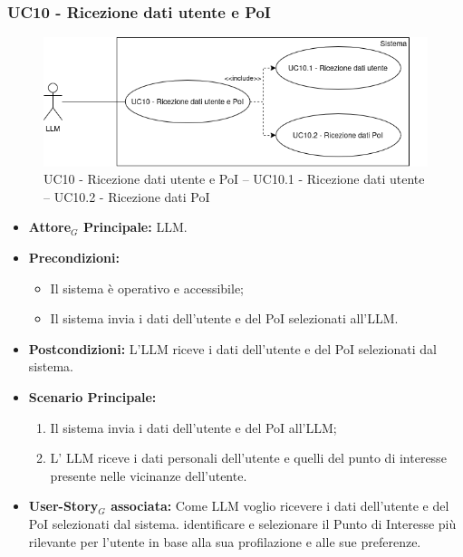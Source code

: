 \documentclass[11pt]{article}
\begin{document}
\begin{justify}
\subsubsection{\textbf{UC10 - Ricezione dati utente e PoI}}
\begin{figure}[H]
    \centering
    \includegraphics[width=0.7\linewidth]{UC10image.png}
    \caption{UC10 - Ricezione dati utente e PoI -- UC10.1 - Ricezione dati utente -- UC10.2 - Ricezione dati PoI}
    \label{fig:UC10}
\end{figure}
\label{UC10}
\begin{itemize}
    \item \textbf{Attore$_G$ Principale:} LLM.
    \item \textbf{Precondizioni:} 
        \begin{itemize}
        \item Il sistema è operativo e accessibile;
          \item Il sistema invia i dati dell'utente e del PoI selezionati all'LLM.
        \end{itemize}
      \item \textbf{Postcondizioni:} L'LLM riceve i dati dell'utente e del PoI selezionati dal sistema.
    \item \textbf{Scenario Principale:} 
        \begin{enumerate}
          \item Il sistema invia i dati dell'utente e del PoI all'LLM;
        \item L' LLM riceve i dati personali dell'utente e quelli del punto di interesse presente nelle vicinanze dell'utente.
        \end{enumerate}
      \item \textbf{User-Story$_G$ associata:} Come LLM voglio ricevere i dati dell'utente e del PoI selezionati dal sistema.
        identificare e selezionare il Punto di Interesse più rilevante per l'utente in base alla sua profilazione e alle sue preferenze.
\end{itemize}

\end{justify}
\end{document}
